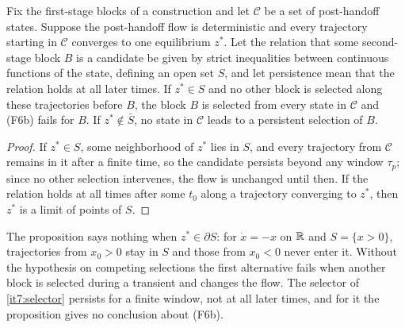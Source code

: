 \documentclass[11pt,letterpaper]{report}
\begin{document}
Fix the first-stage blocks of a construction and let $\mathcal C$ be a set of post-handoff states. Suppose the post-handoff flow is deterministic and every trajectory starting in $\mathcal C$ converges to one equilibrium $z^*$. Let the relation that some second-stage block $B$ is a candidate be given by strict inequalities between continuous functions of the state, defining an open set $S$, and let persistence mean that the relation holds at all later times. If $z^*\in S$ and no other block is selected along these trajectories before $B$, the block $B$ is selected from every state in $\mathcal C$ and (F6b) fails for $B$. If $z^*\notin\bar S$, no state in $\mathcal C$ leads to a persistent selection of $B$.
\begin{proof}
If $z^*\in S$, some neighborhood of $z^*$ lies in $S$, and every trajectory from $\mathcal C$ remains in it after a finite time, so the candidate persists beyond any window $\tau_p$; since no other selection intervenes, the flow is unchanged until then. If the relation holds at all times after some $t_0$ along a trajectory converging to $z^*$, then $z^*$ is a limit of points of $S$.
\end{proof}

The proposition says nothing when $z^*\in\partial S$: for $\dot x=-x$ on $\mathbb R$ and $S=\{x>0\}$, trajectories from $x_0>0$ stay in $S$ and those from $x_0<0$ never enter it. Without the hypothesis on competing selections the first alternative fails when another block is selected during a transient and changes the flow. The selector of \cref{it7:selector} persists for a finite window, not at all later times, and for it the proposition gives no conclusion about (F6b).
\end{document}

